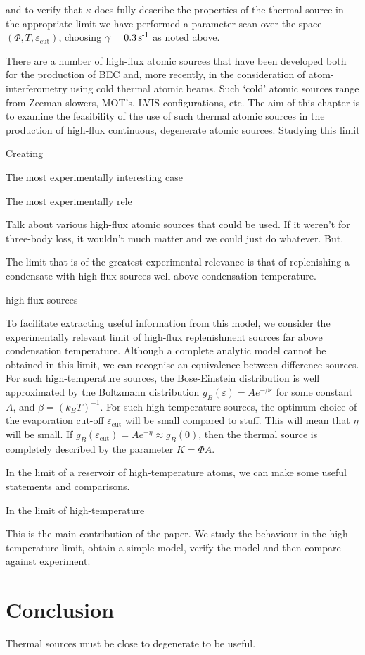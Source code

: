 and to verify that $\kappa$ does fully describe the properties of the thermal source in the appropriate limit we have performed a parameter scan over the space $(\Phi, T, \varepsilon_\text{cut})$, choosing $\gamma = \unit[0.3]{s\textsuperscript{-1}}$ as noted above.



There are a number of high-flux atomic sources that have been developed both for the production of BEC and, more recently, in the consideration of atom-interferometry using cold thermal atomic beams. Such `cold' atomic sources range from Zeeman slowers, MOT's, LVIS configurations, etc. The aim of this chapter is to examine the feasibility of the use of such thermal atomic sources in the production of high-flux continuous, degenerate atomic sources. Studying this limit

Creating

The most experimentally interesting case

The most experimentally rele


Talk about various high-flux atomic sources that could be used. If it weren't for three-body loss, it wouldn't much matter and we could just do whatever. But. 


The limit that is of the greatest experimental relevance is that of replenishing a condensate with high-flux sources well above condensation temperature.

high-flux sources


To facilitate extracting useful information from this model, we consider the experimentally relevant limit of high-flux replenishment sources far above condensation temperature. Although a complete analytic model cannot be obtained in this limit, we can recognise an equivalence between difference sources. For such high-temperature sources, the Bose-Einstein distribution is well approximated by the Boltzmann distribution $g_B(\varepsilon) = A e^{-\beta\varepsilon}$ for some constant $A$, and $\beta = \left(k_B T\right)^{-1}$. For such high-temperature sources, the optimum choice of the evaporation cut-off $\varepsilon_\text{cut}$ will be small compared to stuff. This will mean that $\eta$ will be small. If $g_B(\varepsilon_\text{cut}) = A e^{-\eta} \approx g_B(0)$, then the thermal source is completely described by the parameter $K=\Phi A$.




In the limit of a reservoir of high-temperature atoms, we can make some useful statements and comparisons.


In the limit of high-temperature 


This is the main contribution of the paper. We study the behaviour in the high temperature limit, obtain a simple model, verify the model and then compare against experiment.




\section{Conclusion}
Thermal sources must be close to degenerate to be useful. 
